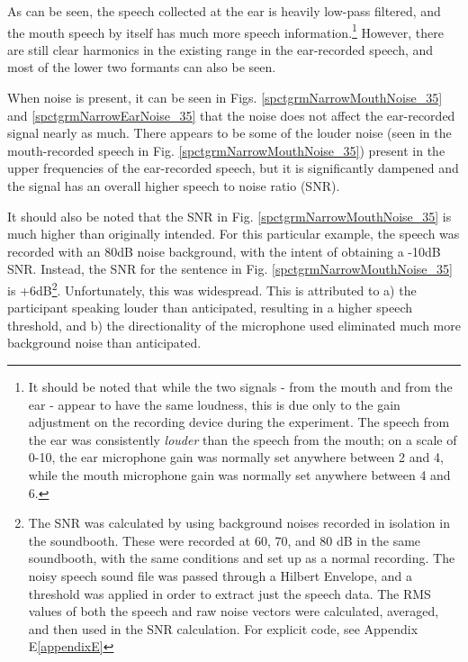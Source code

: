 \documentclass[dissertation,copyright]{uathesis}
\begin{document}
As can be seen, the speech collected at the ear is heavily low-pass filtered, and the mouth speech by itself has much more speech information.\footnote{It should be noted that while the two signals - from the mouth and from the ear - appear to have the same loudness, this is due only to the gain adjustment on the recording device during the experiment.  The speech from the ear was consistently \textit{louder} than the speech from the mouth; on a scale of 0-10, the ear microphone gain was normally set anywhere between 2 and 4, while the mouth microphone gain was normally set anywhere between 4 and 6.}
However, there are still clear harmonics in the existing range in the ear-recorded speech, and most of the lower two formants can also be seen.

When noise is present, it can be seen in Figs. \ref{spctgrmNarrowMouthNoise_35} and \ref{spctgrmNarrowEarNoise_35} that the noise does not affect the ear-recorded signal nearly as much.  There appears to be some of the louder noise (seen in the mouth-recorded speech in Fig. \ref{spctgrmNarrowMouthNoise_35}) present in the upper frequencies of the ear-recorded speech, but it is significantly dampened and the signal has an overall higher speech to noise ratio (SNR).

It should also be noted that the SNR in Fig. \ref{spctgrmNarrowMouthNoise_35} is much higher than originally intended.  For this particular example, the speech was recorded with an 80dB noise background, with the intent of obtaining a -10dB SNR.  Instead, the SNR for the sentence in Fig. \ref{spctgrmNarrowMouthNoise_35} is +6dB\footnote{The SNR was calculated by using background noises recorded in isolation in the soundbooth.  These were recorded at 60, 70, and 80 dB in the same soundbooth, with the same conditions and set up as a normal recording.  The noisy speech sound file was passed through a Hilbert Envelope, and a threshold was applied in order to extract just the speech data.  The RMS values of both the speech and raw noise vectors were calculated, averaged, and then used in the SNR calculation.  For explicit code, see Appendix E\ref{appendixE}}.  Unfortunately, this was widespread. This is attributed to a) the participant speaking louder than anticipated, resulting in a higher speech threshold, and b) the directionality of the microphone used eliminated much more background noise than anticipated.
\end{document}
